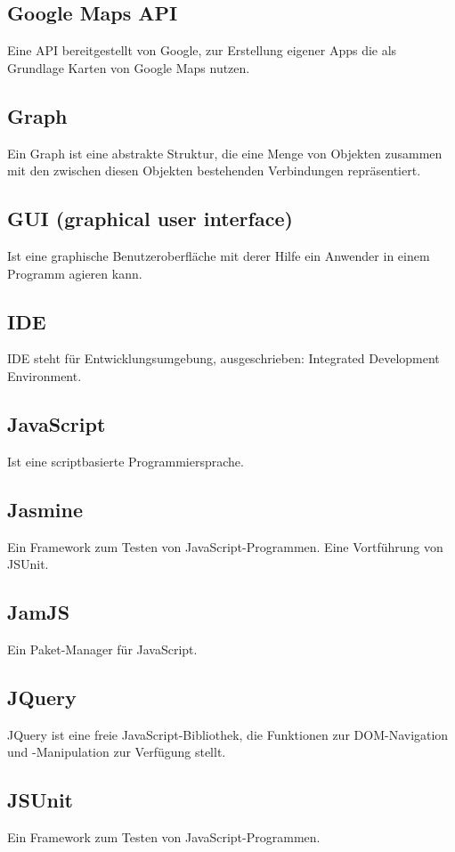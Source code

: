 \documentclass[11pt,a4paper]{article}
\begin{document}
\subsection{Google Maps API}
Eine API bereitgestellt von Google, zur Erstellung eigener Apps die als Grundlage Karten von Google Maps nutzen.
\subsection{Graph}
Ein Graph ist eine abstrakte Struktur, die eine Menge von Objekten zusammen mit den zwischen diesen Objekten bestehenden Verbindungen repräsentiert.
\subsection{GUI (graphical user interface)} Ist eine graphische Benutzeroberfläche mit derer Hilfe ein Anwender in einem Programm agieren kann.
\subsection{IDE} 
IDE steht für Entwicklungsumgebung, ausgeschrieben: Integrated Development Environment.
\subsection{JavaScript} Ist eine scriptbasierte Programmiersprache.
\subsection{Jasmine} Ein Framework zum Testen von JavaScript-Programmen. Eine Vortführung von JSUnit.
\subsection{JamJS}
Ein Paket-Manager für JavaScript.
\subsection{JQuery}
JQuery ist eine freie JavaScript-Bibliothek, die Funktionen zur DOM-Navigation und -Manipulation zur Verfügung stellt.
\subsection{JSUnit} Ein Framework zum Testen von JavaScript-Programmen.
\end{document}
